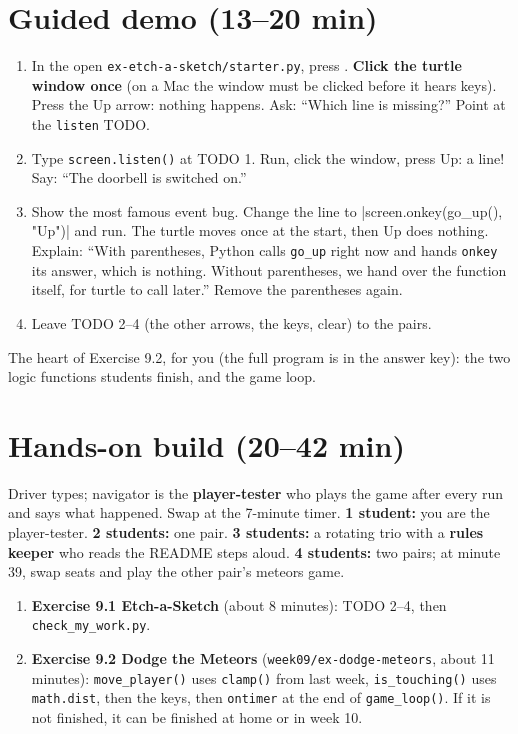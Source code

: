 \section{Guided demo (13--20 min)}
\begin{workedexample}
\begin{enumerate}[leftmargin=1.4em]
  \item In the open \texttt{ex-etch-a-sketch/starter.py}, press . \textbf{Click the turtle window once} (on a Mac the window must be clicked
        before it hears keys). Press the Up arrow: nothing happens. Ask: \enquote{Which line is missing?} Point at the \texttt{listen} TODO.
  \item Type \texttt{screen.listen()} at TODO 1. Run, click the window, press Up: a line! Say: \enquote{The doorbell is switched on.}
  \item Show the most famous event bug. Change the line to \py|screen.onkey(go_up(), "Up")| and run. The turtle moves once at the start,
        then Up does nothing. Explain: \enquote{With parentheses, Python calls \texttt{go\_up} right now and hands \texttt{onkey} its answer, which is nothing.
        Without parentheses, we hand over the function itself, for turtle to call later.} Remove the parentheses again.
  \item Leave TODO 2--4 (the other arrows, the keys, clear) to the pairs.
\end{enumerate}
\end{workedexample}
The heart of Exercise 9.2, for you (the full program is in the answer key): the two logic functions students finish, and the game loop.

\section{Hands-on build (20--42 min)}
\begin{pairroles}
Driver types; navigator is the \textbf{player-tester} who plays the game after every run and says what happened. Swap at the 7-minute timer.
\textbf{1 student:} you are the player-tester. \textbf{2 students:} one pair. \textbf{3 students:} a rotating trio with a \textbf{rules keeper}
who reads the README steps aloud. \textbf{4 students:} two pairs; at minute 39, swap seats and play the other pair's meteors game.
\end{pairroles}
\begin{enumerate}[leftmargin=1.4em]
  \item \textbf{Exercise 9.1 Etch-a-Sketch} (about 8 minutes): TODO 2--4, then \texttt{check\_my\_work.py}.
  \item \textbf{Exercise 9.2 Dodge the Meteors} (\texttt{week09/ex-dodge-meteors}, about 11 minutes): \texttt{move\_player()} uses \texttt{clamp()} from
        last week, \texttt{is\_touching()} uses \texttt{math.dist}, then the keys, then \texttt{ontimer} at the end of \texttt{game\_loop()}.
        If it is not finished, it can be finished at home or in week 10.
\end{enumerate}

